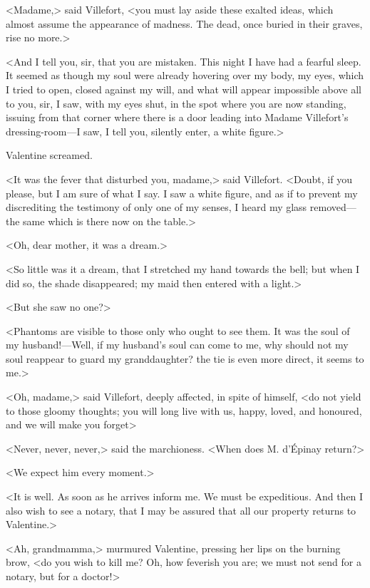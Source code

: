  <Madame,> said Villefort, <you must lay aside these exalted ideas, which almost assume the appearance of madness. The dead, once buried in their graves, rise no more.> 

 <And I tell you, sir, that you are mistaken. This night I have had a fearful sleep. It seemed as though my soul were already hovering over my body, my eyes, which I tried to open, closed against my will, and what will appear impossible above all to you, sir, I saw, with my eyes shut, in the spot where you are now standing, issuing from that corner where there is a door leading into Madame Villefort's dressing-room—I saw, I tell you, silently enter, a white figure.> 

 Valentine screamed. 

 <It was the fever that disturbed you, madame,> said Villefort.  <Doubt, if you please, but I am sure of what I say. I saw a white figure, and as if to prevent my discrediting the testimony of only one of my senses, I heard my glass removed—the same which is there now on the table.> 

 <Oh, dear mother, it was a dream.> 

 <So little was it a dream, that I stretched my hand towards the bell; but when I did so, the shade disappeared; my maid then entered with a light.> 

 <But she saw no one?> 

 <Phantoms are visible to those only who ought to see them. It was the soul of my husband!—Well, if my husband's soul can come to me, why should not my soul reappear to guard my granddaughter? the tie is even more direct, it seems to me.> 

 <Oh, madame,> said Villefort, deeply affected, in spite of himself, <do not yield to those gloomy thoughts; you will long live with us, happy, loved, and honoured, and we will make you forget\longdash> 

 <Never, never, never,> said the marchioness. <When does M. d'Épinay return?> 

 <We expect him every moment.> 

 <It is well. As soon as he arrives inform me. We must be expeditious. And then I also wish to see a notary, that I may be assured that all our property returns to Valentine.> 

 <Ah, grandmamma,> murmured Valentine, pressing her lips on the burning brow, <do you wish to kill me? Oh, how feverish you are; we must not send for a notary, but for a doctor!> 


